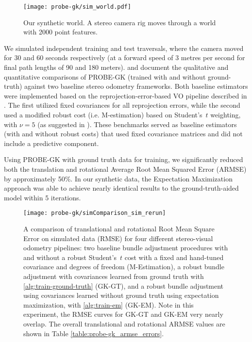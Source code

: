 \begin{figure}
\centering
   \texttt{[image: probe-gk/sim\_world.pdf]}
   \label{fig:probe_SimWorld} 
\caption{Our synthetic world. A stereo camera rig moves through a world with 2000 point features.}
\end{figure}

We simulated independent training and test traversals, where the camera moved for
30 and 60 seconds respectively (at a forward speed of 3 metres per second for final path
lengths of 90 and 180 meters).   and  document the qualitative and quantitative comparisons of PROBE-GK (trained with and without ground-truth) against two baseline stereo odometry frameworks. Both baseline estimators were implemented based on the reprojection-error-based VO pipeline described in  . The first utilized fixed covariances for all reprojection errors, while the second used a modified robust cost (i.e. M-estimation) based on Student's~$t$ weighting, with $\nu = 5$ (as suggested in \cite{kerl2013robust}).  These benchmarks served as baseline estimators (with and without robust costs) that used fixed covariance matrices and did not include a predictive component. 

Using PROBE-GK with ground truth data for training,
we significantly reduced both the translation and rotational Average Root Mean Squared Error (ARMSE)
by approximately 50\%. In our synthetic data, the Expectation Maximization approach was able to achieve nearly identical results to the ground-truth-aided model within 5 iterations.  

\begin{figure}
    \centering
    \texttt{[image: probe-gk/simComparison\_sim\_rerun]}
    \caption{A comparison of translational and rotational Root Mean Square Error on simulated data
    (RMSE) for four different stereo-visual odometry pipelines: two baseline
    bundle adjustment procedures with and without a robust Student's~$t$ cost with a fixed and
    hand-tuned covariance and degrees of freedom (M-Estimation), a robust bundle
    adjustment with covariances learned from ground truth with
    \cref{alg:train-ground-truth} (GK-GT), and a robust bundle adjustment using
    covariances learned without ground truth using expectation maximization,
    with \cref{alg:train-em} (GK-EM). Note in this experiment, the RMSE curves
    for GK-GT and GK-EM very nearly overlap. The overall translational and
    rotational ARMSE values are shown in Table \ref{table:probe-gk_armse_errors}.} 
    \label{fig:probe_sim_comparison}
\end{figure}

